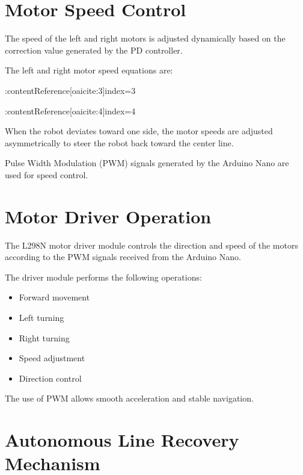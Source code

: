 \documentclass[12pt,a4paper,oneside]{report}
\begin{document}
\section{Motor Speed Control}

The speed of the left and right motors is adjusted dynamically based on the correction value generated by the PD controller.

The left and right motor speed equations are:

:contentReference[oaicite:3]{index=3}

:contentReference[oaicite:4]{index=4}

When the robot deviates toward one side, the motor speeds are adjusted asymmetrically to steer the robot back toward the center line.

Pulse Width Modulation (PWM) signals generated by the Arduino Nano are used for speed control.


\section{Motor Driver Operation}

The L298N motor driver module controls the direction and speed of the motors according to the PWM signals received from the Arduino Nano.

The driver module performs the following operations:

\begin{itemize}
\item Forward movement
\item Left turning
\item Right turning
\item Speed adjustment
\item Direction control
\end{itemize}

The use of PWM allows smooth acceleration and stable navigation.


\section{Autonomous Line Recovery Mechanism}
\end{document}
